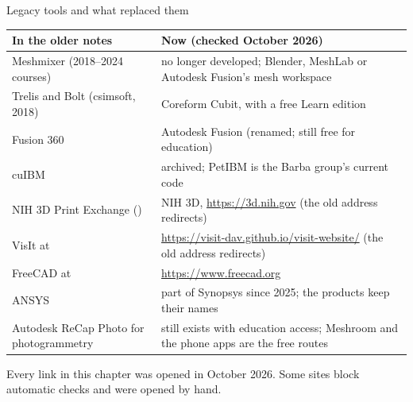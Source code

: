 \documentclass[aspectratio=169,11pt]{beamer}
\begin{document}
\begin{frame}{Legacy tools and what replaced them}
\scriptsize
\begin{tabular}{@{}L{0.29\textwidth}L{0.64\textwidth}@{}}
\toprule
In the older notes & Now (checked October 2026)\\
\midrule
Meshmixer (2018--2024 courses) & no longer developed; Blender, MeshLab or Autodesk Fusion's mesh workspace\\
Trelis and Bolt (csimsoft, 2018) & Coreform Cubit, with a free Learn edition\\
Fusion 360 & Autodesk Fusion (renamed; still free for education)\\
cuIBM & archived; PetIBM is the Barba group's current code\\
NIH 3D Print Exchange () & NIH 3D, \url{https://3d.nih.gov} (the old address redirects)\\
VisIt at  & \url{https://visit-dav.github.io/visit-website/} (the old address redirects)\\
FreeCAD at  & \url{https://www.freecad.org}\\
ANSYS & part of Synopsys since 2025; the products keep their names\\
Autodesk ReCap Photo for photogrammetry & still exists with education access; Meshroom and the phone apps are the free routes\\
\bottomrule
\end{tabular}
\vspace{2mm}
\small Every link in this chapter was opened in October 2026. Some sites block automatic checks and were opened by hand.
\end{frame}
\end{document}
